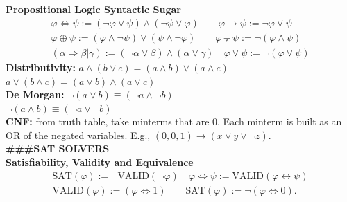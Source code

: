 \documentclass{article}
\begin{document}
\begin{multicols}{4}
\textbf{Propositional Logic Syntactic Sugar} 
\begin{gather*} 
{\varphi \Leftrightarrow \psi := (\neg \varphi \vee \psi) \wedge (\neg \psi \vee \varphi)} \qquad {\varphi \rightarrow \psi := \neg \varphi \vee \psi} \\
{\varphi \oplus \psi := (\varphi \wedge \neg \psi) \vee (\psi \wedge \neg \varphi) }\qquad {\varphi \barwedge \psi := \neg (\varphi \wedge \psi)} \\
{(\alpha \Rightarrow \beta | \gamma) := ( \neg \alpha \vee \beta) \wedge (\alpha \vee \gamma)} \quad {\varphi \bar{\vee}\psi := \neg (\varphi \vee \psi)}
\end{gather*}
\textbf{Distributivity:} ${a \wedge ( b \vee c ) = (a \wedge b) \vee (a \wedge c)}$
${a \vee ( b \wedge c ) = (a \vee b) \wedge (a \vee c)}$ \\
\textbf{De Morgan:} $\neg(a \vee b) \equiv (\neg a \wedge \neg b)$ \\
$\neg(a \wedge b) \equiv (\neg a \vee \neg b) $ \\
\textbf{CNF:} from truth table, take minterms that are 0. 
Each minterm is built as an OR of the negated variables. E.g., ${(0, 0, 1) \rightarrow (x \vee y \vee \neg z)}$. \\

\textbf{\#\#\#SAT SOLVERS} \\

\textbf{Satisfiability, Validity and Equivalence}
\begin{gather*}
\text{SAT}(\varphi) := \neg \text{VALID}(\neg \varphi) \quad \varphi \Leftrightarrow \psi := \text{VALID}(\varphi \leftrightarrow \psi) \\
\text{VALID}(\varphi) := (\varphi \Leftrightarrow 1) \qquad \text{SAT}(\varphi) := \neg(\varphi \Leftrightarrow 0).
\end{gather*} \\


\end{multicols}
\end{document}

